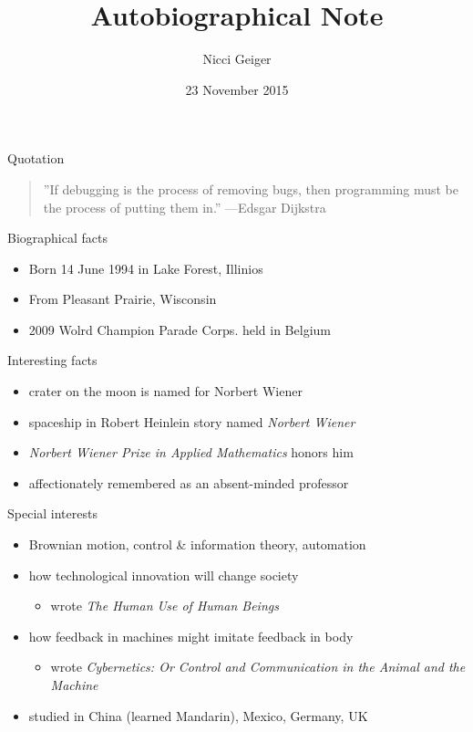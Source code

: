 \documentclass{beamer}
\title{Autobiographical Note}
\author{Nicci Geiger}
\institute{Cornell College}
\date{23 November 2015}
\begin{document}
\begin{frame}
  \titlepage
\end{frame}

\begin{frame}{Quotation}
\begin{quotation}
\noindent
''If debugging is the process of removing bugs, then programming must be the process of putting them in.''
  \flushright
  ---Edsgar Dijkstra
  \end{quotation}
\end{frame}

\begin{frame}{Biographical facts}
\begin{itemize}
  \item Born 14 June 1994 in Lake Forest, Illinios
  \item From Pleasant Prairie, Wisconsin
  \item 2009 Wolrd Champion Parade Corps. held in Belgium
  \end{itemize}
\end{frame}

\begin{frame}{Interesting facts}
\begin{itemize}
  \item crater on the moon is named for Norbert Wiener
  \item spaceship in Robert Heinlein story
    named \emph{Norbert Wiener}
  \item \emph{Norbert Wiener Prize in Applied Mathematics} honors him
  \item affectionately remembered as an absent-minded professor
  \end{itemize}
\end{frame}

\begin{frame}{Special interests}
\begin{itemize}
  \item Brownian motion, control \& information theory,
    automation
  \item how technological innovation will
    change society 
  \begin{itemize}
    \item wrote \emph{The Human Use of Human Beings}
    \end{itemize}
  \item how feedback in machines might imitate feedback in body
  \begin{itemize}
    \item wrote \emph{Cybernetics: Or Control
      and Communication in the Animal and the Machine}
    \end{itemize}
  \item studied in China (learned Mandarin), Mexico, Germany, UK
  \end{itemize}
\end{frame}
\end{document}
